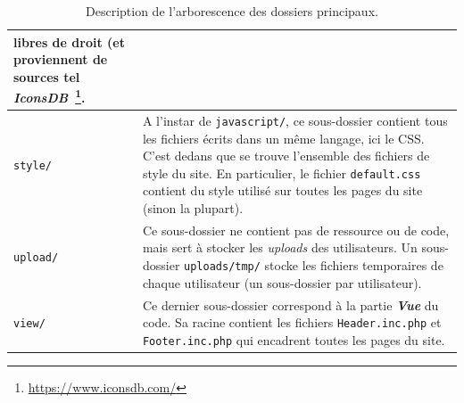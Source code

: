\begin{savenotes}
\begin{table}[!t]
\begin{tabular}{|l|p{}|}
                        libres de droit (et proviennent de sources tel 
                        \textit{IconsDB}~\footnote{\url{https://www.iconsdb.com/}}.\\
  \hline
  \texttt{style/} & A l'instar de \texttt{javascript/}, ce sous-dossier contient tous les fichiers 
                    écrits dans un même langage, ici le CSS. C'est dedans que se trouve l'ensemble 
                    des fichiers de style du site. En particulier, le fichier \texttt{default.css} 
                    contient du style utilisé sur toutes les pages du site (sinon la plupart).\\
  \hline
  \texttt{upload/} & Ce sous-dossier ne contient pas de ressource ou de code, mais sert à stocker 
                     les \textit{uploads} des utilisateurs. Un sous-dossier \texttt{uploads/tmp/} 
                     stocke les fichiers temporaires de chaque utilisateur (un sous-dossier par 
                     utilisateur).\\
  \hline
  \texttt{view/} & Ce dernier sous-dossier correspond à la partie \textbf{\textit{Vue}} du code. 
                   Sa racine contient les fichiers \texttt{Header.inc.php} et 
                   \texttt{Footer.inc.php} qui encadrent toutes les pages du site.\\ %
  \hline
\end{tabular}
\caption{Description de l'arborescence des dossiers principaux.}
\label{intro.tab.folders}
\end{table}
\end{savenotes}

